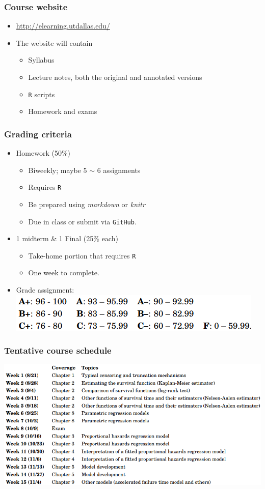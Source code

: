 \documentclass{beamer}
\begin{document}
\begin{frame}
\frametitle{Course website}
\begin{itemize}
\item \url{http://elearning.utdallas.edu/}
\item The website will contain 
\begin{itemize}
\item Syllabus
\item Lecture notes, both the original and annotated versions
\item \texttt{R} scripts
\item Homework and exams
\end{itemize}
\end{itemize}
\end{frame}

\begin{frame}
\frametitle{Grading criteria}
\begin{itemize}
\item Homework (50\%)
\begin{itemize}
\item Biweekly; maybe 5 $\sim$ 6 assignments
\item Requires \texttt{R}
\item Be prepared using \textit{markdown} or \textit{knitr}
\item Due in class or submit via \texttt{GitHub}.
\end{itemize}
\item 1 midterm \& 1 Final (25\% each)
\begin{itemize}
\item Take-home portion that requires \texttt{R}
\item One week to complete.
\end{itemize}
\item Grade assignment:\\\vspace{.5cm}
\centering
\includegraphics[scale = .4]{grade}
\end{itemize}
\end{frame}

\begin{frame}
\frametitle{Tentative course schedule}
\centering\vspace{-.2cm}
\includegraphics[scale = .4]{schedule}
\end{frame}
\end{document}
